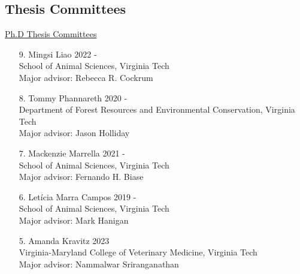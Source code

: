 \documentclass[margin,line,10pt]{res}
\begin{document}
\begin{resume}
\vspace{0.5cm}
\section{\sc Thesis Committees}

\begin{flushleft}
\hspace{0.2cm} \underline{Ph.D Thesis Committees}
\end{flushleft}
\begin{enumerate}





  \item [9.] Mingsi Liao \hfill 2022 - \\
  School of Animal Sciences,  Virginia Tech \\ 
  Major advisor: Rebecca R. Cockrum 

  \vspace{0.3cm}
  
  \item [8.] Tommy Phannareth \hfill 2020 - \\
  Department of Forest Resources and Environmental Conservation, Virginia Tech \\
  Major advisor: Jason Holliday

  \vspace{0.3cm}

   \item [7.] Mackenzie Marrella \hfill 2021 - \\
      School of Animal Sciences, Virginia Tech\\
      Major advisor: Fernando H. Biase
  

  \vspace{0.3cm}
  
  \item [6.] Let\'{i}cia Marra Campos  \hfill 2019 - \\
  School of Animal Sciences,  Virginia Tech \\ 
  Major advisor: Mark Hanigan

  \vspace{0.3cm}


  \item [5.] Amanda Kravitz  \hfill 2023 \\
  Virginia-Maryland College of Veterinary Medicine,  Virginia Tech \\ 
  Major advisor: Nammalwar Sriranganathan

  \vspace{0.3cm}


\end{enumerate}
\end{resume}
\end{document}
